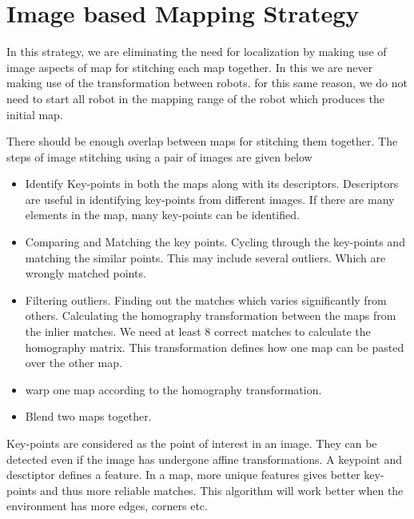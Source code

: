 \documentclass[MTech]{iitmdiss}
\begin{document}
\section{Image based Mapping Strategy}
In this strategy, we are eliminating the need for localization by making use of image aspects of map for stitching each map together. In this we are never making use of the transformation between robots. for this same reason, we do not need to start all robot in the mapping range of the robot which produces the initial map.\par
There should be enough overlap between maps for stitching them together. The steps of image stitching using a pair of images are given below
\begin{itemize}
    \item Identify Key-points in both the maps along with its descriptors. Descriptors are useful in identifying key-points from different images. If there are many elements in the map, many key-points can be identified.
    \item Comparing and Matching the key points. Cycling through the key-points and matching the similar points. This may include several outliers. Which are wrongly matched points.
    \item Filtering outliers. Finding out the matches which varies significantly from others.
    \itme Calculating the homography transformation between the maps from the inlier matches. We need at least 8 correct matches to calculate the homography matrix. This transformation defines how one map can be pasted over the other map.
    \item warp one map according to the homography transformation.
    \item Blend two maps together.
\end{itemize}

Key-points are considered as the point of interest in an image. They can be detected even if the image has undergone affine transformations. A keypoint and desctiptor defines a feature. In a map, more unique features gives better key-points and thus more reliable matches. This algorithm will work better when the environment has more edges, corners etc. 
\end{document}
